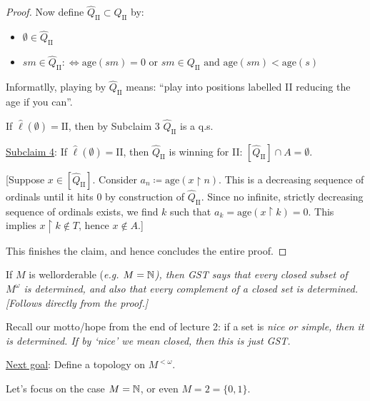 \documentclass[]{article}
\newcommand{\II}{\textrm{II}}
\newcommand{\om}{\omega}
\newcommand{\lom}{{<\omega}}
\begin{document}
\begin{proof}
Now define $\hat{Q}_\II \subset Q_\II$ by:
\begin{itemize}
    \item $\emptyset \in \hat{Q}_{\II}$
    \item $sm \in \hat{Q}_\II :\iff \textrm{age}(sm) = 0\textrm{ or }sm \in Q_\II \textrm{ and }\textrm{age}(sm) < \textrm{age}(s)$
\end{itemize}

Informatlly, playing by $\hat{Q}_\II$ means: ``play into positions labelled II reducing the age if you can''.

If $\hat{\ell}(\emptyset) = \II$, then by Subclaim 3 $\hat{Q}_\II$ is a q.s.

\underline{Subclaim 4}: If $\hat{\ell}(\emptyset) = \II$, then $\hat{Q}_\II$ is winning for II: $[\hat{Q}_\II]\cap A = \emptyset$.

[Suppose $x \in [\hat{Q}_\II]$. Consider $a_n \coloneqq \textrm{age}(x\restriction n)$. This is a decreasing sequence of ordinals until it hits 0 by construction of $\hat{Q}_\II$. Since no infinite, strictly decreasing sequence of ordinals exists, we find $k$ such that $a_k = \textrm{age}(x\restriction k) = 0$. This implies $x\restriction k \not \in T$, hence $x\not\in A$.]

This finishes the claim, and hence concludes the entire proof.
\end{proof}

\begin{remark*}
    If $M$ is wellorderable (\it{e.g.} $M = \mathbb{N}$), then GST says that every closed subset of $M^\om$ is determined, and also that every complement of a closed set is determined. [Follows directly from the proof.]
\end{remark*}

Recall our motto/hope from the end of lecture 2: if a set is \it{nice} or \it{simple}, then it is determined. If by `nice' we mean closed, then this is just GST.

\underline{Next goal}: Define a topology on $M^\lom$.

Let's focus on the case $M = \mathbb{N}$, or even $M = 2 = \{0,1\}$.
\end{document}
